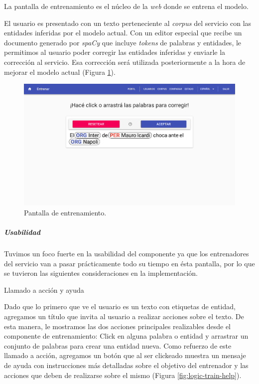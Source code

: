 \documentclass[12pt,a4paper,]{scrartcl}
\let\oldsubparagraph\subparagraph
\renewcommand{\subparagraph}[1]{\oldsubparagraph{#1}\mbox{}}
\begin{document}
La pantalla de entrenamiento es el núcleo de la \emph{web} donde se entrena el modelo.

El usuario es presentado con un texto perteneciente al \emph{corpus} del servicio con las entidades inferidas por el modelo actual. Con un editor especial que recibe un documento generado por \emph{spaCy} que incluye \emph{tokens} de palabras y entidades, le permitimos al usuario poder corregir las entidades inferidas y enviarle la corrección al servicio. Esa corrección será utilizada posteriormente a la hora de mejorar el modelo actual (Figura \ref{fig:logic-train}).

\begin{figure}[H]

{\centering \includegraphics{assets/logic/train.pdf} 

}

\caption{Pantalla de entrenamiento.}\label{fig:logic-train}
\end{figure}

\hypertarget{usabilidad}{%
\subparagraph{Usabilidad}\label{usabilidad}}

Tuvimos un foco fuerte en la usabilidad del componente ya que los entrenadores del servicio van a pasar prácticamente todo su tiempo en ésta pantalla, por lo que se tuvieron las siguientes consideraciones en la implementación.

Llamado a acción y ayuda

Dado que lo primero que ve el usuario es un texto con etiquetas de entidad, agregamos un título que invita al usuario a realizar acciones sobre el texto. De esta manera, le mostramos las dos acciones principales realizables desde el componente de entrenamiento: Click en alguna palabra o entidad y arrastrar un conjunto de palabras para crear una entidad nueva.
Como refuerzo de este llamado a acción, agregamos un botón que al ser clickeado muestra un mensaje de ayuda con instrucciones más detalladas sobre el objetivo del entrenador y las acciones que deben de realizarse sobre el mismo (Figura \ref{fig:logic-train-help}).
\end{document}
